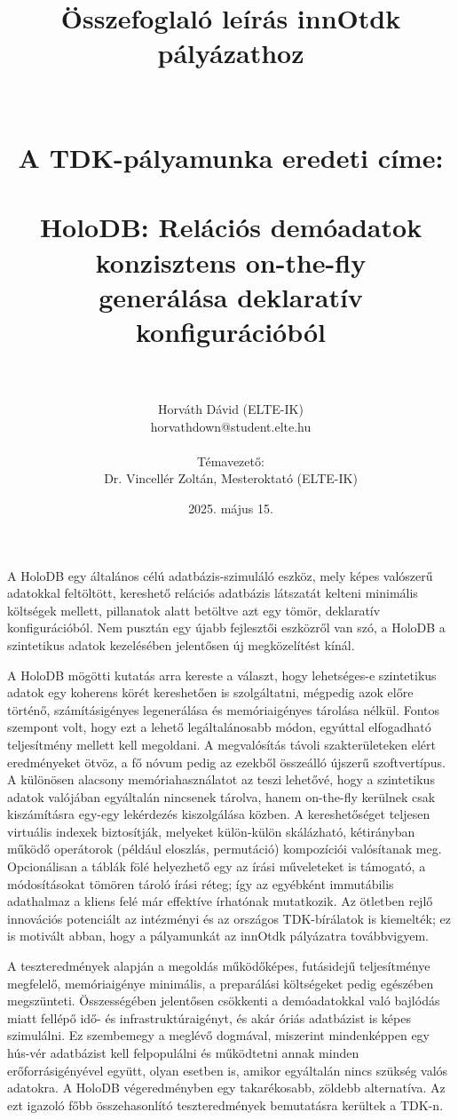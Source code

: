 \documentclass[12pt]{article}
\title{Összefoglaló leírás innOtdk pályázathoz \\ ~ \\ ~ \\ {\Large A TDK-pályamunka eredeti címe: \\ ~ \\ HoloDB: Relációs demóadatok konzisztens on-the-fly \\ generálása deklaratív konfigurációból} \\ ~}
\author{Horváth Dávid (ELTE-IK) \\ horvathdown@student.elte.hu \\ ~ \\ Témavezető:\\ Dr. Vincellér Zoltán, Mesteroktató (ELTE-IK)}
\date{2025. május 15.}
\begin{document}
\begin{titlepage}
\maketitle
\thispagestyle{empty}
\end{titlepage}

\cleardoublepage

A HoloDB egy általános célú adatbázis-szimuláló eszköz, mely képes valószerű adatokkal feltöltött, kereshető relációs adatbázis látszatát kelteni
minimális költségek mellett, pillanatok alatt betöltve azt egy tömör, deklaratív konfigurációból.
Nem pusztán egy újabb fejlesztői eszközről van szó, a HoloDB a szintetikus adatok kezelésében jelentősen új megközelítést kínál.

A HoloDB mögötti kutatás arra kereste a választ, hogy lehetséges-e szintetikus adatok egy koherens körét kereshetően is szolgáltatni, mégpedig azok előre történő, számításigényes legenerálása és memóriaigényes tárolása nélkül.
Fontos szempont volt, hogy ezt a lehető legáltalánosabb módon, egyúttal elfogadható teljesítmény mellett kell megoldani.
A megvalósítás távoli szakterületeken elért eredményeket ötvöz, a fő nóvum pedig az ezekből összeálló újszerű szoftvertípus.
A különösen alacsony memóriahasználatot az teszi lehetővé, hogy a szintetikus adatok valójában egyáltalán nincsenek tárolva, hanem on-the-fly kerülnek csak kiszámításra egy-egy lekérdezés kiszolgálása közben.
A kereshetőséget teljesen virtuális indexek biztosítják, melyeket külön-külön skálázható, kétirányban működő operátorok (például eloszlás, permutáció) kompozíciói valósítanak meg.
Opcionálisan a táblák fölé helyezhető egy az írási műveleteket is támogató, a módosításokat tömören tároló írási réteg;
így az egyébként immutábilis adathalmaz a kliens felé már effektíve írhatónak mutatkozik.
Az ötletben rejlő innovációs potenciált az intézményi és az országos TDK-bírálatok is kiemelték; ez is motivált abban, hogy a pályamunkát az innOtdk pályázatra továbbvigyem.

A teszteredmények alapján a megoldás működőképes, futásidejű teljesítménye megfelelő, memóriaigénye minimális, a preparálási költségeket pedig egészében megszünteti.
Összességében jelentősen csökkenti a demóadatokkal való bajlódás miatt fellépő idő- és infrastruktúraigényt, és akár óriás adatbázist is képes szimulálni.
Ez szembemegy a meglévő dogmával, miszerint mindenképpen egy hús-vér adatbázist kell felpopulálni és működtetni annak minden erőforrásigényével együtt, olyan esetben is, amikor egyáltalán nincs szükség valós adatokra.
A HoloDB végeredményben egy takarékosabb, zöldebb alternatíva.
Az ezt igazoló főbb összehasonlító teszteredmények bemutatásra kerültek a TDK-n.
\end{document}
